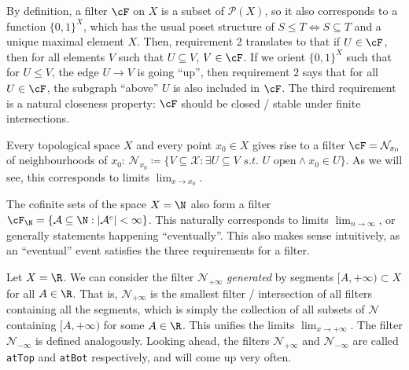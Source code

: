 By definition, a filter \(\cF\) on \(X\) is a subset of \(\mathcal{P}(X)\), so it also corresponds to a function \(\{0, 1\}^X\), which has the usual poset structure of \(S \leq T \iff S \subseteq T\) and a unique maximal element \(X\). Then, requirement 2 translates to that if \(U \in \cF\), then for all elements \(V\) such that \(U \subseteq V\), \(V \in \cF\). If we orient \(\{0, 1\}^X\) such that for \(U \leq V\), the edge \(U \to V\) is going ``up'', then requirement \(2\) says that for all \(U \in \cF\), the subgraph ``above'' \(U\) is also included in \(\cF\). The third requirement is a natural closeness property: \(\cF\) should be closed / stable under finite intersections.

\begin{example}
  Every topological space \(X\) and every point \(x_0 \in X\) gives rise to a filter \(\cF = \mathcal{N}_{x_0}\) of neighbourhoods of \(x_0\): \(\mathcal{N}_{x_0} \coloneqq \{V \subseteq \mathcal{X} : \exists U \subseteq V \,\, s.t. \,\, U \text{ open} \land x_0 \in U\}\). As we will see, this corresponds to limits \(\lim_{x \to x_0}\).
\end{example}

\begin{example}
  The cofinite sets of the space \(X = \N\) also form a filter \(\cF_{\N} = \{\mathcal{A} \subseteq \N : |\mathcal{A}^c| < \infty\}\). This naturally corresponds to limits \(\lim_{n \to \infty}\), or generally statements happening ``eventually''. This also makes sense intuitively, as an ``eventual'' event satisfies the three requirements for a filter.
\end{example}

\begin{example}
  Let \(X = \R\). We can consider the filter \(\mathcal{N}_{+\infty}\) \textit{generated} by segments \([A, +\infty) \subset X\) for all \(A \in \R\). That is, \(\mathcal{N}_{+\infty}\) is the smallest filter / intersection of all filters containing all the segments, which is simply the collection of all subsets of \(\mathcal{N}\) containing \([A, +\infty)\) for some \(A \in \R\). This unifies the limits \(\lim_{x \to +\infty}\). The filter \(\mathcal{N}_{-\infty}\) is defined analogously. Looking ahead, the filters \(\mathcal{N}_{+\infty}\) and \(\mathcal{N}_{-\infty}\) are called \texttt{atTop} and \texttt{atBot} respectively, and will come up very often.
\end{example}


